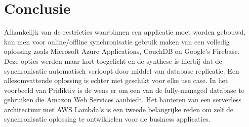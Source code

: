
\chapter{Conclusie}
\label{ch:conclusie}


Afhankelijk van de restricties waarbinnen een applicatie moet worden gebouwd, kan men voor online/offline synchronisatie gebruik maken van een volledig oplossing zoals Microsoft Azure Applications, CouchDB en Google's Firebase. Deze opties werden maar kort toegelicht en de synthese is hierbij dat de synchronisatie automatisch verloopt door middel van database replicatie. Een allesomvattende oplossing is echter niet geschikt voor elke use case. In het voorbeeld van Pridiktiv is de wens er om een van de fully-managed database te gebruiken die Amazon Web Services aanbiedt. Het hanteren van een serverless architectuur met AWS Lambda's is een tweede belangrijke reden om zelf de synchronisatie oplossing te ontwikkelen voor de business applicaties.

